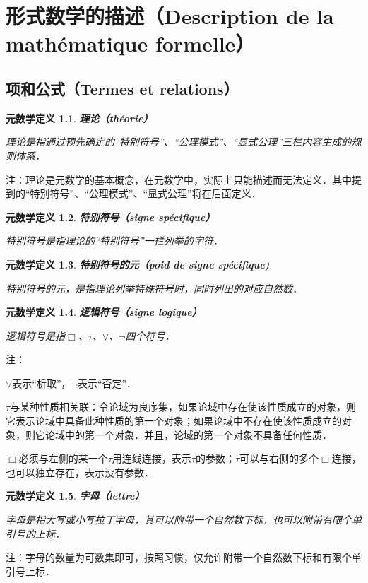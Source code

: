 \documentclass[12pt, a4paper, oneside]{book}
\newtheorem{metadef}{元数学定义}
\begin{document}
	\newpage
	\tableofcontents
	\mainmatter
	
	\chapter{形式数学的描述（Description de la mathématique formelle）}
		\section{项和公式（Termes et relations）}
			\begin{metadef}
				\textbf{理论（théorie）}
				\par
				理论是指通过预先确定的“特别符号”、“公理模式”、“显式公理”三栏内容生成的规则体系．
			\end{metadef}
			\par
			注：理论是元数学的基本概念，在元数学中，实际上只能描述而无法定义．其中提到的“特别符号”、“公理模式”、“显式公理”将在后面定义．
			
			\begin{metadef}
				\textbf{特别符号（signe spécifique）}
				\par
				特别符号是指理论的“特别符号”一栏列举的字符．
			\end{metadef}

			\begin{metadef}
				\textbf{特别符号的元（poid de signe spécifique)}
				\par
				特别符号的元，是指理论列举特殊符号时，同时列出的对应自然数．
			\end{metadef}		

			\begin{metadef}
				\textbf{逻辑符号（signe logique）}
				\par
				逻辑符号是指$\Box$、$\tau$、$\lor$、$\neg$四个符号．
			\end{metadef}
			\par		
			注：
			\par
			$\lor$表示“析取”，$\neg$表示“否定”．
			\par
			$\tau$与某种性质相关联：令论域为良序集，如果论域中存在使该性质成立的对象，则它表示论域中具备此种性质的第一个对象；如果论域中不存在使该性质成立的对象，则它论域中的第一个对象．并且，论域的第一个对象不具备任何性质．
			\par
			$\Box$必须与左侧的某一个$\tau$用连线连接，表示$\tau$的参数；$\tau$可以与右侧的多个$\Box$连接，也可以独立存在，表示没有参数．

			\begin{metadef}
				\textbf{字母（lettre）}
				\par
				字母是指大写或小写拉丁字母，其可以附带一个自然数下标，也可以附带有限个单引号的上标．
			\end{metadef}				
			\par
			注：字母的数量为可数集即可，按照习惯，仅允许附带一个自然数下标和有限个单引号上标．
\end{document}
